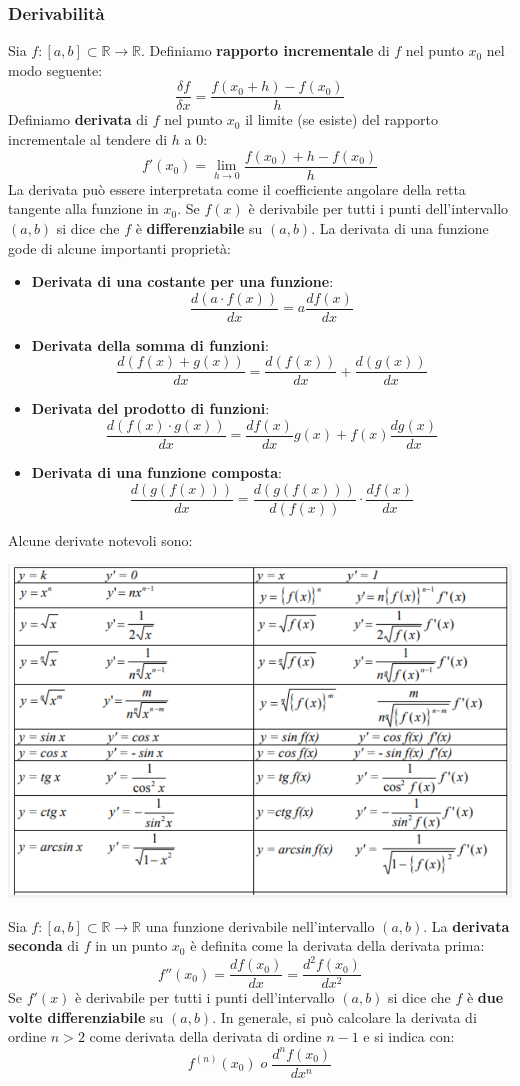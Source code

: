 \documentclass[12pt]{article}
\begin{document}
\subsubsection{Derivabilità}
Sia $f:[a,b] \subset \mathbb{R} \rightarrow \mathbb{R}$. Definiamo \textbf{rapporto incrementale} di $f$ nel punto $x_0$ nel modo seguente:
$$\frac{\delta f}{\delta x} = \frac{f(x_0+h) - f(x_0)}{h}$$
Definiamo \textbf{derivata} di $f$ nel punto $x_0$ il limite (se esiste) del rapporto incrementale al tendere di $h$ a 0:
$$f'(x_0) = \lim_{h \rightarrow 0}{\frac{f(x_0) + h - f(x_0)}{h}}$$
La derivata può essere interpretata come il coefficiente angolare della retta tangente alla funzione in $x_0$.
Se $f(x)$ è derivabile per tutti i punti dell'intervallo $(a,b)$ si dice che $f$ è \textbf{differenziabile} su $(a,b)$.
La derivata di una funzione gode di alcune importanti proprietà:
\begin{itemize}
    \item \textbf{Derivata di una costante per una funzione}: $$\frac{d(a\cdot f(x))}{dx} = a \frac{df(x)}{dx}$$
    \item \textbf{Derivata della somma di funzioni}: $$\frac{d(f(x) + g(x))}{dx} = \frac{d(f(x))}{dx} + \frac{d(g(x))}{dx}$$
    \item \textbf{Derivata del prodotto di funzioni}: $$\frac{d(f(x) \cdot g(x))}{dx} = \frac{df(x)}{dx}g(x) + f(x)\frac{dg(x)}{dx}$$
    \item \textbf{Derivata di una funzione composta}: $$\frac{d(g(f(x)))}{dx} = \frac{d(g(f(x)))}{d(f(x))} \cdot \frac{df(x)}{dx}$$
\end{itemize}
Alcune derivate notevoli sono:
\begin{center}
    \includegraphics[width = 1\linewidth]{Images/92.png}
\end{center}
Sia $f:[a,b] \subset \mathbb{R} \rightarrow \mathbb{R}$ una funzione derivabile nell'intervallo $(a,b)$. La \textbf{derivata seconda} di $f$ in un punto $x_0$ è definita
come la derivata della derivata prima:
$$f''(x_0) = \frac{df(x_0)}{dx} = \frac{d^2f(x_0)}{dx^2}$$
Se $f'(x)$ è derivabile per tutti i punti dell'intervallo $(a,b)$ si dice che $f$ è \textbf{due volte differenziabile} su $(a,b)$.
In generale, si può calcolare la derivata di ordine $n > 2$ come derivata della derivata di ordine $n-1$ e si indica con:
$$f^{(n)}(x_0) \; o \; \frac{d^nf(x_0)}{dx^n}$$
\end{document}
